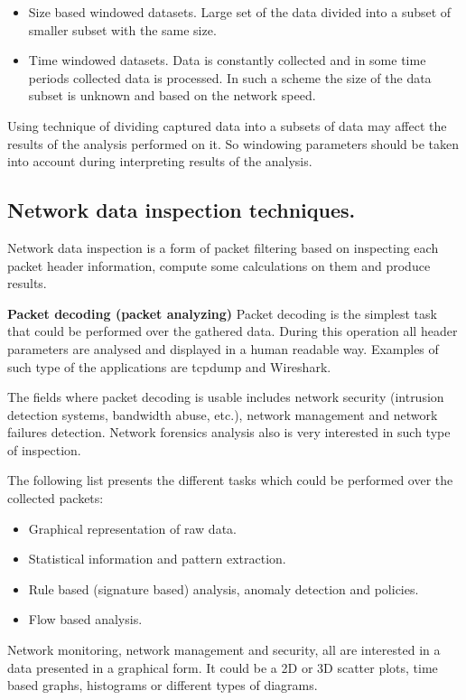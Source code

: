 \documentclass[thesis=M,english]{FITthesis}[2011/07/15]
\begin{document}
\begin{itemize}
\item Size based windowed datasets. Large set of the data divided into a subset of smaller subset with the same size.
\item Time windowed datasets. Data is constantly collected and in some time periods collected data is processed. In such a scheme the size of the data subset is unknown and based on the network speed.
\end{itemize}

Using technique of dividing captured data into a subsets of data may affect the results of the analysis performed on it. So windowing parameters should be taken into account during interpreting results of the analysis.

\subsection{Network data inspection techniques.}
Network data inspection is a form of packet filtering based on inspecting each packet header information, compute some calculations on them and produce results.

\textbf{Packet decoding (packet analyzing)}
Packet decoding is the simplest task that could be performed over the gathered data. During this operation all header parameters are analysed and displayed in a human readable way. Examples of such type of the applications are tcpdump and Wireshark.

The fields where packet decoding is usable includes network security (intrusion detection systems, bandwidth abuse, etc.), network management and network failures detection. Network forensics analysis also is very interested in such type of inspection.

The following list presents the different tasks which could be performed over the collected packets:
\begin{itemize}
\item Graphical representation of raw data.
\item Statistical information and pattern extraction.
\item Rule based (signature based) analysis, anomaly detection and policies.
\item Flow based analysis.
\end{itemize}

Network monitoring, network management and security, all are interested in a data presented in a graphical form. It could be a 2D or 3D scatter plots, time based graphs, histograms or different types of diagrams.
\end{document}

